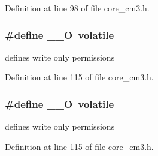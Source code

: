 Definition at line 98 of file core\+\_\+cm3.\+h.

\subsubsection[{\texorpdfstring{\+\_\+\+\_\+O}{__O}}]{\setlength{\rightskip}{0pt plus 5cm}\#define \+\_\+\+\_\+O~volatile}\hypertarget{group___c_m_s_i_s___c_m3__core__definitions_ga7e25d9380f9ef903923964322e71f2f6}{}\label{group___c_m_s_i_s___c_m3__core__definitions_ga7e25d9380f9ef903923964322e71f2f6}
defines \textquotesingle{}write only\textquotesingle{} permissions 

Definition at line 115 of file core\+\_\+cm3.\+h.

\subsubsection[{\texorpdfstring{\+\_\+\+\_\+O}{__O}}]{\setlength{\rightskip}{0pt plus 5cm}\#define \+\_\+\+\_\+O~volatile}\hypertarget{group___c_m_s_i_s___c_m3__core__definitions_ga7e25d9380f9ef903923964322e71f2f6}{}\label{group___c_m_s_i_s___c_m3__core__definitions_ga7e25d9380f9ef903923964322e71f2f6}
defines \textquotesingle{}write only\textquotesingle{} permissions 

Definition at line 115 of file core\+\_\+cm3.\+h.

